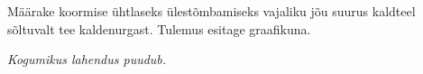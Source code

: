 
Määrake koormise ühtlaseks ülestõmbamiseks vajaliku jõu suurus kaldteel sõltuvalt tee kaldenurgast. Tulemus esitage graafikuna.

\hint

\solu
\textit{Kogumikus lahendus puudub.}
\probend
